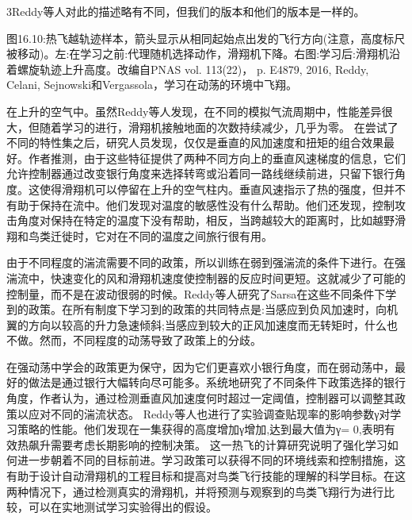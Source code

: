 3Reddy等人对此的描述略有不同，但我们的版本和他们的版本是一样的。

图16.10:热飞越轨迹样本，箭头显示从相同起始点出发的飞行方向(注意，高度标尺被移动)。左:在学习之前:代理随机选择动作，滑翔机下降。右图:学习后:滑翔机沿着螺旋轨迹上升高度。改编自PNAS vol. 113(22)， p. E4879, 2016, Reddy, Celani, Sejnowski和Vergassola，学习在动荡的环境中飞翔。

在上升的空气中。虽然Reddy等人发现，在不同的模拟气流周期中，性能差异很大，但随着学习的进行，滑翔机接触地面的次数持续减少，几乎为零。
在尝试了不同的特性集之后，研究人员发现，仅仅是垂直的风加速度和扭矩的组合效果最好。作者推测，由于这些特征提供了两种不同方向上的垂直风速梯度的信息，它们允许控制器通过改变银行角度来选择转弯或沿着同一路线继续前进，只留下银行角度。这使得滑翔机可以停留在上升的空气柱内。垂直风速指示了热的强度，但并不有助于保持在流中。他们发现对温度的敏感性没有什么帮助。他们还发现，控制攻击角度对保持在特定的温度下没有帮助，相反，当跨越较大的距离时，比如越野滑翔和鸟类迁徙时，它对在不同的温度之间旅行很有用。

由于不同程度的湍流需要不同的政策，所以训练在弱到强湍流的条件下进行。在强湍流中，快速变化的风和滑翔机速度使控制器的反应时间更短。这就减少了可能的控制量，而不是在波动很弱的时候。Reddy等人研究了Sarsa在这些不同条件下学到的政策。在所有制度下学习到的政策的共同特点是:当感应到负风加速时，向机翼的方向以较高的升力急速倾斜;当感应到较大的正风加速度而无转矩时，什么也不做。然而，不同程度的动荡导致了政策上的分歧。

在强动荡中学会的政策更为保守，因为它们更喜欢小银行角度，而在弱动荡中，最好的做法是通过银行大幅转向尽可能多。系统地研究了不同条件下政策选择的银行角度，作者认为，通过检测垂直风加速度何时超过一定阈值，控制器可以调整其政策以应对不同的湍流状态。
Reddy等人也进行了实验调查贴现率的影响参数γ对学习策略的性能。他们发现在一集获得的高度增加γ增加,达到最大值为γ= 0,表明有效热飙升需要考虑长期影响的控制决策。
这一热飞的计算研究说明了强化学习如何进一步朝着不同的目标前进。学习政策可以获得不同的环境线索和控制措施，这有助于设计自动滑翔机的工程目标和提高对鸟类飞行技能的理解的科学目标。在这两种情况下，通过检测真实的滑翔机，并将预测与观察到的鸟类飞翔行为进行比较，可以在实地测试学习实验得出的假设。
